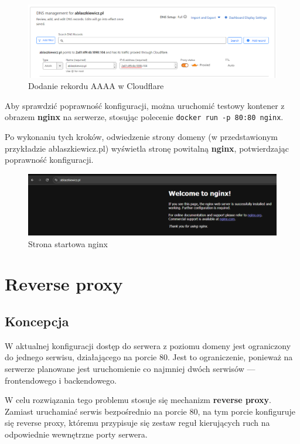 \documentclass{article}
\begin{document}
\begin{figure}[H]
    \centering
    \includegraphics[width=1\linewidth]{ipv6cloudflare.png}
    \caption{Dodanie rekordu AAAA w Cloudflare}
    \label{fig:enter-label}
\end{figure}

Aby sprawdzić poprawność konfiguracji, można uruchomić testowy kontener z obrazem \textbf{nginx} na serwerze, stosując polecenie \lstinline|docker run -p 80:80 nginx|.


Po wykonaniu tych kroków, odwiedzenie strony domeny (w przedstawionym przykładzie ablaszkiewicz.pl) wyświetla stronę powitalną \textbf{nginx}, potwierdzając poprawność konfiguracji.

\begin{figure}[H]
    \centering
    \includegraphics[width=1\linewidth]{ipv6helloWorld.png}
    \caption{Strona startowa nginx}
    \label{fig:enter-label}
\end{figure}


\section{Reverse proxy}

\subsection{Koncepcja}

W aktualnej konfiguracji dostęp do serwera z poziomu domeny jest ograniczony do jednego serwisu, działającego na porcie 80. Jest to ograniczenie, ponieważ na serwerze planowane jest uruchomienie co najmniej dwóch serwisów — frontendowego i backendowego.

W celu rozwiązania tego problemu stosuje się mechanizm \textbf{reverse proxy}. Zamiast uruchamiać serwis bezpośrednio na porcie 80, na tym porcie konfiguruje się reverse proxy, któremu przypisuje się zestaw reguł kierujących ruch na odpowiednie wewnętrzne porty serwera.
\end{document}
